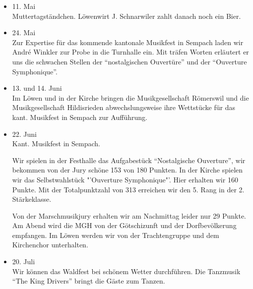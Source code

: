 \begin{multicols}{2}
\begin{itemize}
        \item[]11. Mai\\
        Muttertagständchen. Löwenwirt J. Schnarwiler zahlt danach noch ein Bier.

        \item[]24. Mai\\
        Zur Expertise für das kommende kantonale Musikfest in Sempach laden wir
        André Winkler zur Probe in die Turnhalle ein. Mit träfen Worten
        erläutert er uns die schwachen Stellen der "`nostalgischen Ouvertüre"'
        und der "`Ouverture Symphonique"'.

        \item[]13. und 14. Juni\\
        Im Löwen und in der Kirche bringen die Musikgesellschaft Römerswil und
        die Musikgesellschaft Hildisrieden abwechslungsweise ihre Wettstücke für
        das kant. Musikfest in Sempach zur Aufführung.

        \item[]22. Juni\\
        Kant. Musikfest in Sempach.

        Wir spielen in der Festhalle das Aufgabestück "`Nostalgische
        Ouverture"', wir bekommen von der Jury schöne 153 von 180 Punkten. In
        der Kirche spielen wir das Selbstwahlstück "'Ouverture Symphonique"'.
        Hier erhalten wir 160 Punkte. Mit der Totalpunktzahl von 313 erreichen
        wir den 5. Rang in der 2. Stärkeklasse.

        Von der Marschmusikjury erhalten wir am Nachmittag leider nur 29 Punkte.
        Am Abend wird die MGH von der Götschizunft und der Dorfbevölkerung
        empfangen. Im Löwen werden wir von der Trachtengruppe und dem
        Kirchenchor unterhalten.

        \item[]20. Juli\\
        Wir können das Waldfest bei schönem Wetter durchführen. Die Tanzmusik
        "`The King Drivers"' bringt die Gäste zum Tanzen.



    \end{itemize}

\end{multicols}
